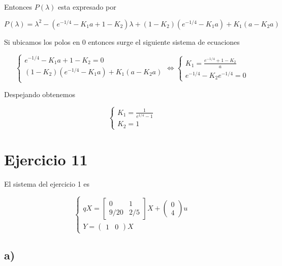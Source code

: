\documentclass[11pt,a4paper]{article}
\newcommand{\siseq}[1]{ \left\{ \begin{array}{c}
    #1
\end{array} \right. }
\begin{document}
    Entonces $P(\lambda)$ esta expresado por 
    
    \begin{equation}
        P(\lambda) = \lambda^2 - ( e^{-1/4} - K_1a + 1- K_2 )\lambda + (1-K_2)(e^{-1/4} - K_1a ) + K_1( a - K_2 a )
    \end{equation}

    Si ubicamos los polos en $0$ entonces surge el siguiente sistema de ecuaciones

    \begin{equation}
        \siseq{
            e^{-1/4} - K_1a + 1- K_2 = 0 \\ 
            (1-K_2)(e^{-1/4} - K_1a ) + K_1( a - K_2 a ) \\ 
        } \Leftrightarrow
        \siseq{
            K_1 = \frac{e^{-1/4} + 1 - K_2 }{a} \\ 
            e^{-1/4} - K_2 e^{-1/4} = 0
        }
    \end{equation}

    Despejando obtenemos 

    \begin{equation}
        \siseq{
            K_1 = \frac{1}{e^{1/4}-1} \\ 
            K_2 = 1
        }
    \end{equation}


    \section*{Ejercicio 11}

    El sistema del ejercicio 1 es 

    \begin{equation}
        \siseq{
            qX = 
            \begin{bmatrix}
                0 & 1 \\ 
                9/20 & 2/5 
            \end{bmatrix} X +
            \begin{pmatrix}
                0 \\ 4
            \end{pmatrix} u\\ 
            Y = 
            \begin{pmatrix}
                1 & 0     
            \end{pmatrix} X
        }
    \end{equation}

    \subsection*{a)}
\end{document}
